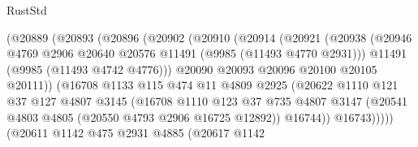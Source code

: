 \begin{lexlean}{RustStd}
\begin{coremodule}
                            (@20889
                              (@20893
                                (@20896
                                  (@20902
                                    (@20910
                                      (@20914
                                        (@20921
                                          (@20938
                                            (@20946
                                              @4769
                                              @2906
                                              @20640
                                              @20576
                                              @11491
                                              (@9985 (@11493 @4770 @2931)))
                                            @11491
                                            (@9985 (@11493 @4742 @4776)))
                                          @20090
                                          @20093
                                          @20096
                                          @20100
                                          @20105
                                          @20111))
                                      (@16708
                                        @1133
                                        @115
                                        @474
                                        @11
                                        @4809
                                        @2925
                                        (@20622
                                          @1110
                                          @121
                                          @37
                                          @127
                                          @4807
                                          @3145
                                          (@16708
                                            @1110
                                            @123
                                            @37
                                            @735
                                            @4807
                                            @3147
                                            (@20541 @4803 @4805 (@20550 @4793 @2906 @16725 @12892))
                                            @16744))
                                        @16743)))))
                              (@20611
                                @1142
                                @475
                                @2931
                                @4885
                                (@20617
                                  @1142

\end{coremodule}
\end{lexlean}
